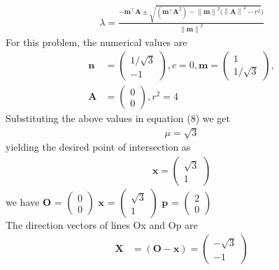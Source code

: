 \documentclass[10pt,a4paper]{report}
\providecommand{\norm}[1]{\left\lVert#1\right\rVert}
\newcommand{\myvec}[1]{\ensuremath{\begin{pmatrix}#1\end{pmatrix}}}
\let\vec\mathbf
\begin{document}
\begin{multicols}{2}
{	  \begin{align}                                                                                      
		  \lambda = \frac{-\vec{m}^{\top}\vec{A}\pm \sqrt{({\vec{m}^{\top}\vec{A}}^2) -\norm{\vec{m}}^2({\norm{\vec{A}}}^2 - r^2 })}{\norm{\vec{m}}^2}                                                  
	  \end{align}                                                                                     
	  For this problem, the numerical values are                                                  
	  \begin{align}              
		  \vec{n} &= \myvec{1/\sqrt{3} \\ -1}, c = 0,
		  \vec{m} = \myvec{1 \\ 1/\sqrt{3}},                                      \\
                            \vec{A} &= \myvec{0 \\ 0},  r^2 = 4                                             
	  \end{align}                                                                                 
	  Substituting the above values in equation (8) we get                                                        
	  \fi
	  \begin{align}                                                                               
		  \mu= \sqrt{3}
	  \end{align}
	  yielding  
the desired point of intersection as                                               
\begin{align}
	\vec{x} = \myvec{\sqrt{3} \\ 1}                               
\end{align}
\iffalse
we have $\vec O$ = $\begin{pmatrix} 0 \\ 0 \end{pmatrix}$ 
	$\vec x$ = $\begin{pmatrix} \sqrt{3} \\ 1 \end{pmatrix}$ 
		$\vec p$ = $\begin{pmatrix} 2 \\ 0 \end{pmatrix}$ \\
			The direction vectors of lines Ox and Op are \\
	\begin{align}
		\vec {X} &=(\vec {O-x})=\myvec{-\sqrt{3} \\ -1} \\

\end{align}}
\end{multicols}
\end{document}
